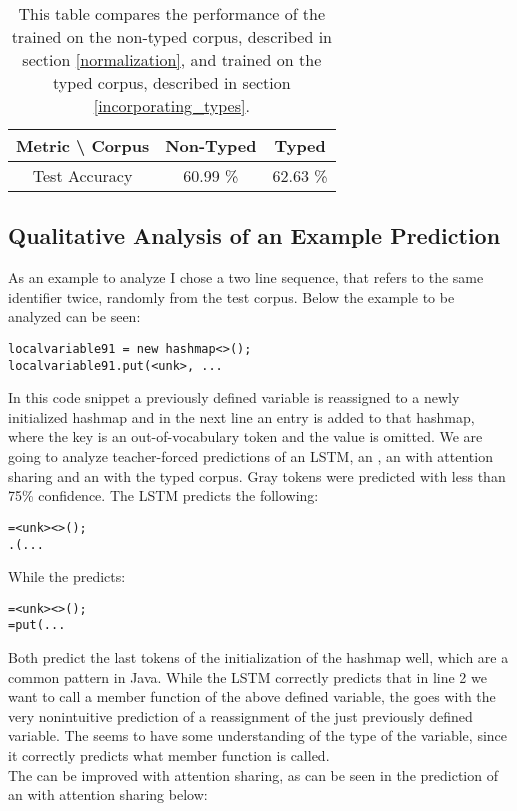 \documentclass[11pt]{article}
\begin{document}
\begin{table}
\centering
	\begin{tabular}{c | c | c }
		Metric \textbackslash{} Corpus & Non-Typed & Typed \\\hline
		Test Accuracy & 60.99 \% & 62.63 \%
	\end{tabular}
\caption{This table compares the performance of the \spn trained on the non-typed corpus, described in section \ref{normalization}, and trained on the typed corpus, described in section \ref{incorporating_types}.}
\label{typed_exp}
\end{table}

\subsection{Qualitative Analysis of an Example Prediction}
As an example to analyze I chose a two line sequence, that refers to the same identifier twice, randomly from the test corpus.
Below the example to be analyzed can be seen:
\begin{verbatim}
localvariable91 = new hashmap<>();
localvariable91.put(<unk>, ...
\end{verbatim}
In this code snippet a previously defined variable is reassigned to a newly initialized hashmap and in the next line an entry is added to that hashmap, where the key is an out-of-vocabulary token and the value is omitted.
We are going to analyze teacher-forced predictions of an LSTM, an \spn, an \spn with attention sharing and an \spn with the typed corpus. Gray tokens were predicted with less than 75\% confidence.
The LSTM predicts the following:
\begin{alltt}
 =  <unk><>();
.( ...
\end{alltt}
 While the \spn predicts:
\begin{alltt}
 =  <unk><>();
 = put( ...
\end{alltt}
Both predict the last tokens of the initialization of the hashmap well, which are a common pattern in Java. While the LSTM correctly predicts that in line 2 we want to call a member function of the above defined variable, the \spn goes with the very nonintuitive prediction of a reassignment of the just previously defined variable. The \spn seems to have some understanding of the type of the variable, since it correctly predicts what member function is called.\\
The \spn can be improved with attention sharing, as can be seen in the prediction of an \spn with attention sharing below:
\end{document}

